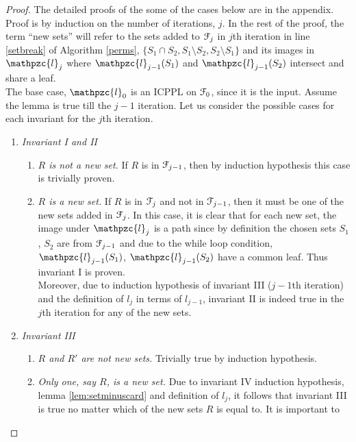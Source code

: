 \documentclass[a4paper,UKenglish,numberwithinsect]{lipics} %
\def\cF{{\cal F}}
\def\cl{\mathpzc{l}}
\begin{document}
\begin{proof}
The detailed proofs of the some of the cases below are in the appendix.
  Proof is by induction on the number of iterations, $j$. In the rest
  of the proof, the term ``new sets'' will refer to the sets added
  to $\cF_j$ in $j$th iteration in line \ref{setbreak} of Algorithm
  \ref{perms}, $\{S_1 \cap S_2, S_1 \setminus S_2, S_2 \setminus S_1
  \}$ and its images in $\cl_j$ where $\cl_{j-1}(S_1)$ and
  $\cl_{j-1}(S_2)$
  intersect and share a leaf.\\
  \noindent
  The base case, $\cl_0$ is an ICPPL on $\cF_0$, since it is the
  input.  Assume the lemma is true till the $j-1$ iteration. Let us consider
the possible cases for each invariant for the  $j$th  iteration.

  \noindent
 \begin{enumerate}[{Case }1:]
  \item {\em Invariant I and II}
    \begin{enumerate}[{Case 1.}1: ]
    \item {\em $R$ is not a new set.} If $R$ is in
      $\cF_{j-1}$, then by induction hypothesis this case is trivially
      proven.
    \item {\em $R$ is a new set.} If $R$ is in $\cF_{j}$
      and not in $\cF_{j-1}$, then it must be one of the new sets
      added in $\cF_j$. In this case, it is clear that for each new
      set, the image under $\cl_j$ is a path since by definition the
      chosen sets $S_1$, $S_2$ are from $\cF_{j-1}$ and due to the
      while loop condition, $\cl_{j-1}(S_1)$, $\cl_{j-1}(S_2)$ have a
      common leaf. Thus invariant I is proven.\\
      Moreover, due to induction hypothesis of invariant III ($j-1$th
      iteration) and the definition of $l_j$ in terms of $l_{j-1}$,
      invariant II is indeed true in the $j$th iteration for any of
      the new sets.
   \end{enumerate}
  \item {\em Invariant III}
    \begin{enumerate}[{Case 2.}1:]
    \item {\em $R$ and $R'$ are not new sets.} Trivially
      true by induction hypothesis.
    \item {\em Only one, say $R$, is a new set.} Due to invariant IV
      induction hypothesis, lemma \ref{lem:setminuscard} and
      definition of $l_j$, it follows that invariant III is true no
      matter which of the new sets $R$ is equal to. It is important to

\end{enumerate}
\end{enumerate}
\end{proof}
\end{document}

